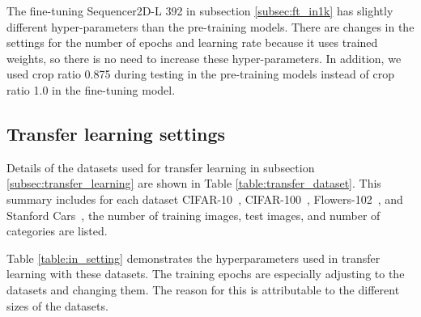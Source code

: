\documentclass{article}
\begin{document}
The fine-tuning Sequencer2D-L 392 in subsection \ref{subsec:ft_in1k} has slightly different hyper-parameters than the pre-training models. There are changes in the settings for the number of epochs and learning rate because it uses trained weights, so there is no need to increase these hyper-parameters. In addition, we used crop ratio 0.875 during testing in the pre-training models instead of crop ratio 1.0 in the fine-tuning model.

\subsection{Transfer learning settings}
\label{subsec:tfl_settings}
Details of the datasets used for transfer learning in subsection \ref{subsec:transfer_learning} are shown in Table \ref{table:transfer_dataset}. This summary includes for each dataset CIFAR-10~\cite{krizhevsky2009learning}, CIFAR-100~\cite{krizhevsky2009learning}, Flowers-102~\cite{nilsback2008automated}, and Stanford Cars~\cite{krause20133d}, the number of training images, test images, and number of categories are listed.

Table \ref{table:in_setting} demonstrates the hyperparameters used in transfer learning with these datasets. The training epochs are especially adjusting to the datasets and changing them. The reason for this is attributable to the different sizes of the datasets.
\end{document}
